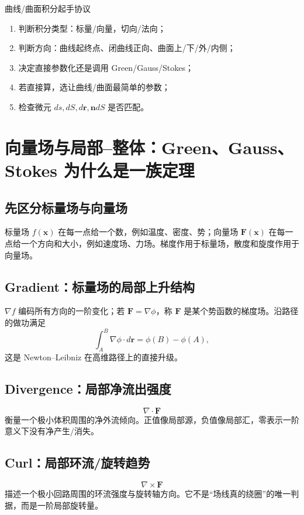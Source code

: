 \documentclass[11pt,a4paper,openany]{ctexbook}
\begin{document}
\begin{methodbox}{曲线/曲面积分起手协议}
\begin{enumerate}
  \item 判断积分类型：标量/向量，切向/法向；
  \item 判断方向：曲线起终点、闭曲线正向、曲面上/下/外/内侧；
  \item 决定直接参数化还是调用 Green/Gauss/Stokes；
  \item 若直接算，选让曲线/曲面最简单的参数；
  \item 检查微元 $ds,dS,d\bm r,\bm n dS$ 是否匹配。
\end{enumerate}
\end{methodbox}

\chapter{向量场与局部--整体：Green、Gauss、Stokes 为什么是一族定理}

\section{先区分标量场与向量场}
标量场 $f(\bm x)$ 在每一点给一个数，例如温度、密度、势；向量场 $\bm F(\bm x)$ 在每一点给一个方向和大小，例如速度场、力场。梯度作用于标量场，散度和旋度作用于向量场。

\section{Gradient：标量场的局部上升结构}
$\nabla f$ 编码所有方向的一阶变化；若 $\bm F=\nabla\phi$，称 $\bm F$ 是某个势函数的梯度场。沿路径的做功满足
\[
\int_A^B \nabla\phi\cdot d\bm r=\phi(B)-\phi(A),
\]
这是 Newton--Leibniz 在高维路径上的直接升级。

\section{Divergence：局部净流出强度}
\[
\nabla\cdot\bm F
\]
衡量一个极小体积周围的净外流倾向。正值像局部源，负值像局部汇，零表示一阶意义下没有净产生/消失。

\section{Curl：局部环流/旋转趋势}
\[
\nabla\times\bm F
\]
描述一个极小回路周围的环流强度与旋转轴方向。它不是“场线真的绕圈”的唯一判据，而是一阶局部旋转量。
\end{document}
